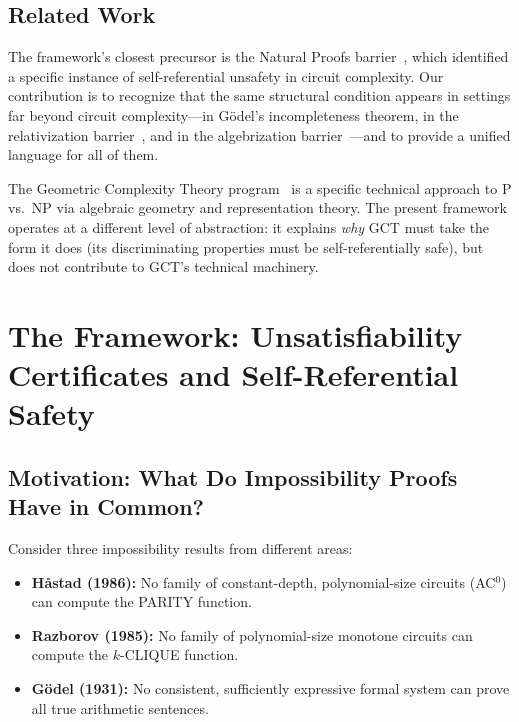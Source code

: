 \documentclass[11pt,a4paper]{article}
\theoremstyle{plain}
\theoremstyle{definition}
\theoremstyle{remark}
\begin{document}
\subsection{Related Work}

The framework's closest precursor is the Natural Proofs barrier~\cite{RazborovRudich1994}, which identified a specific instance of self-referential unsafety in circuit complexity. Our contribution is to recognize that the same structural condition appears in settings far beyond circuit complexity---in G\"{o}del's incompleteness theorem, in the relativization barrier~\cite{BakerGillSolovay1975}, and in the algebrization barrier~\cite{AaronsonWigderson2009}---and to provide a unified language for all of them.

The Geometric Complexity Theory program~\cite{MulmuleySohoni2001} is a specific technical approach to P vs.\ NP via algebraic geometry and representation theory. The present framework operates at a different level of abstraction: it explains \emph{why} GCT must take the form it does (its discriminating properties must be self-referentially safe), but does not contribute to GCT's technical machinery.

\section{The Framework: Unsatisfiability Certificates and Self-Referential Safety}
\label{sec:framework}

\subsection{Motivation: What Do Impossibility Proofs Have in Common?}

Consider three impossibility results from different areas:

\begin{itemize}
\item \textbf{H\r{a}stad (1986):} No family of constant-depth, polynomial-size circuits (AC$^0$) can compute the PARITY function.
\item \textbf{Razborov (1985):} No family of polynomial-size monotone circuits can compute the $k$-CLIQUE function.
\item \textbf{G\"{o}del (1931):} No consistent, sufficiently expressive formal system can prove all true arithmetic sentences.
\end{itemize}
\end{document}
